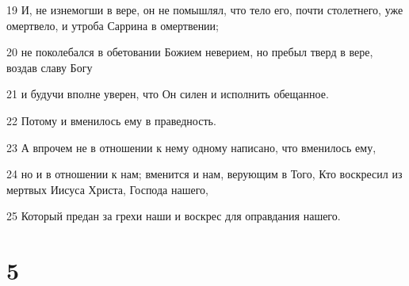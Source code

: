 \par 19 И, не изнемогши в вере, он не помышлял, что тело его, почти столетнего, уже омертвело, и утроба Саррина в омертвении;
\par 20 не поколебался в обетовании Божием неверием, но пребыл тверд в вере, воздав славу Богу
\par 21 и будучи вполне уверен, что Он силен и исполнить обещанное.
\par 22 Потому и вменилось ему в праведность.
\par 23 А впрочем не в отношении к нему одному написано, что вменилось ему,
\par 24 но и в отношении к нам; вменится и нам, верующим в Того, Кто воскресил из мертвых Иисуса Христа, Господа нашего,
\par 25 Который предан за грехи наши и воскрес для оправдания нашего.

\chapter{5}

